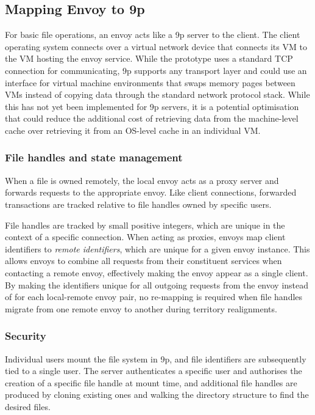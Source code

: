 \subsection{Mapping Envoy to 9p}

For basic file operations, an envoy acts like a 9p server to the client. The client operating system connects over a virtual network device that connects its VM to the VM hosting the envoy service. While the prototype uses a standard TCP connection for communicating, 9p supports any transport layer and could use an interface for virtual machine environments that swaps memory pages between VMs instead of copying data through the standard network protocol stack. While this has not yet been implemented for 9p servers, it is a potential optimisation that could reduce the additional cost of retrieving data from the machine-level cache over retrieving it from an OS-level cache in an individual VM.

\subsubsection{File handles and state management}

When a file is owned remotely, the local envoy acts as a proxy server and forwards requests to the appropriate envoy. Like client connections, forwarded transactions are tracked relative to file handles owned by specific users.

File handles are tracked by small positive integers, which are unique in the context of a specific connection. When acting as proxies, envoys map client identifiers to \emph{remote identifiers}, which are unique for a given envoy instance. This allows envoys to combine all requests from their constituent services when contacting a remote envoy, effectively making the envoy appear as a single client. By making the identifiers unique for all outgoing requests from the envoy instead of for each local-remote envoy pair, no re-mapping is required when file handles migrate from one remote envoy to another during territory realignments.

\subsubsection{Security}

Individual users mount the file system in 9p, and file identifiers are subsequently tied to a single user. The server authenticates a specific user and authorises the creation of a specific file handle at mount time, and additional file handles are produced by cloning existing ones and walking the directory structure to find the desired files.

